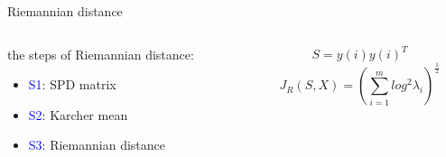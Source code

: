 \documentclass[10pt]{beamer}
\begin{document}
\begin{frame}{Riemannian distance}
   \begin{columns}
        \begin{column}{0.5\textwidth}
            the steps of Riemannian distance:
      \begin{itemize}
      \item \textcolor{blue}{S1}:   SPD matrix
      \item \textcolor{blue}{S2}:  Karcher mean
      \item \textcolor{blue}{S3}:  Riemannian distance
 	 \end{itemize}  
        \end{column}
        \begin{column}{0.5\textwidth}  %
               \begin{equation}
              S = y(i)y(i)^T
               \end{equation}
                \begin{equation}
                  J_R(S,X) =  \left(  \sum_{i=1}^mlog^2\lambda_i  \right)^\frac{1}{2}
                \end{equation}
                
        \end{column}
    \end{columns}
\end{frame}
\end{document}
